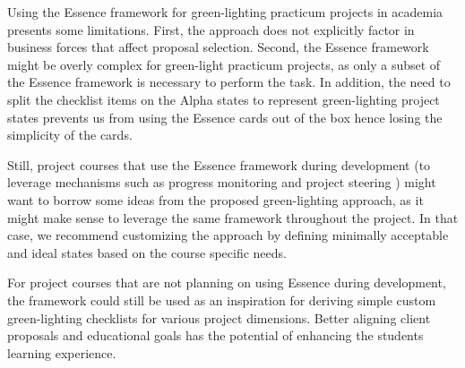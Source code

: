 \documentclass[conference]{IEEEtran}
\begin{document}
Using the Essence framework for green-lighting practicum projects in academia presents some limitations. 
First, the approach does not explicitly factor in business forces that affect proposal selection. 
Second, the Essence framework might be overly complex for green-light practicum projects, 
as only a subset of the Essence framework is necessary to perform the task.
In addition, the need to split the checklist items on the Alpha states to represent green-lighting 
project states prevents us from using the Essence cards out of the box hence losing the simplicity of the cards.

Still, project courses that use the Essence framework during development (to leverage mechanisms such as progress 
monitoring and project steering \cite{ICSE2014}) might want to borrow some ideas from the proposed green-lighting approach, 
as it might make sense to leverage the same framework throughout the project.
In that case, we recommend customizing the approach by defining minimally acceptable and ideal states based on the course specific needs. 

For project courses that are not planning on using Essence during development, 
the framework could still be used as an inspiration for deriving simple custom green-lighting checklists for various project dimensions. Better aligning client proposals and educational goals has the potential of enhancing the students learning experience.


%
%

\end{document}
